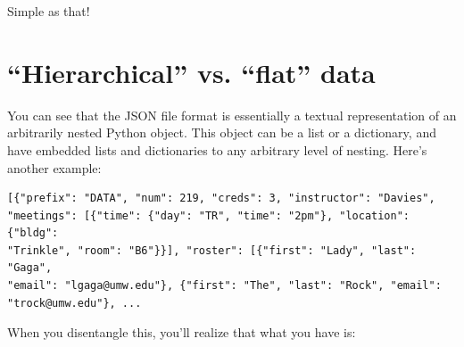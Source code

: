 \normalsize
Simple as that!

\section{``Hierarchical'' vs. ``flat'' data}

You can see that the JSON file format is essentially a textual representation
of an arbitrarily nested Python object. This object can be a list or a
dictionary, and have embedded lists and dictionaries to any arbitrary level of
nesting. Here's another example:

\begin{Verbatim}[fontsize=\small,samepage=true,frame=none]
[{"prefix": "DATA", "num": 219, "creds": 3, "instructor": "Davies",
"meetings": [{"time": {"day": "TR", "time": "2pm"}, "location": {"bldg":
"Trinkle", "room": "B6"}}], "roster": [{"first": "Lady", "last": "Gaga",
"email": "lgaga@umw.edu"}, {"first": "The", "last": "Rock", "email":
"trock@umw.edu"}, ...
\end{Verbatim}

When you disentangle this, you'll realize that what you have is:

\vspace{.2in}

